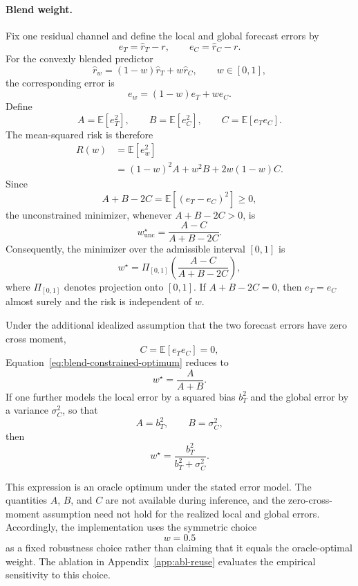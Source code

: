 \paragraph{Blend weight.}
Fix one residual channel and define the local and global forecast errors
by
\[
e_T
=
\widehat r_T-r,
\qquad
e_C
=
\widehat r_C-r.
\]
For the convexly blended predictor
\[
\widehat r_w
=
(1-w)\widehat r_T+w\widehat r_C,
\qquad
w\in[0,1],
\]
the corresponding error is
\[
e_w
=
(1-w)e_T+we_C.
\]
Define
\[
A
=
\mathbb{E}[e_T^2],
\qquad
B
=
\mathbb{E}[e_C^2],
\qquad
C
=
\mathbb{E}[e_Te_C].
\]
The mean-squared risk is therefore
\begin{align}
R(w)
&=
\mathbb{E}[e_w^2]
\nonumber\\
&=
(1-w)^2A+w^2B+2w(1-w)C.
\label{eq:blend-general-risk}
\end{align}
Since
\[
A+B-2C
=
\mathbb{E}\!\left[(e_T-e_C)^2\right]
\geq0,
\]
the unconstrained minimizer, whenever $A+B-2C>0$, is
\begin{equation}
w_{\mathrm{unc}}^\star
=
\frac{A-C}{A+B-2C}.
\label{eq:blend-unconstrained-optimum}
\end{equation}
Consequently, the minimizer over the admissible interval $[0,1]$ is
\begin{equation}
w^\star
=
\Pi_{[0,1]}
\left(
\frac{A-C}{A+B-2C}
\right),
\label{eq:blend-constrained-optimum}
\end{equation}
where $\Pi_{[0,1]}$ denotes projection onto $[0,1]$. If
$A+B-2C=0$, then $e_T=e_C$ almost surely and the risk is independent
of $w$.

Under the additional idealized assumption that the two forecast errors
have zero cross moment,
\begin{equation}
C
=
\mathbb{E}[e_Te_C]
=
0,
\label{eq:blend-uncorrelated-assumption}
\end{equation}
Equation~\eqref{eq:blend-constrained-optimum} reduces to
\begin{equation}
w^\star
=
\frac{A}{A+B}.
\label{eq:blend-uncorrelated-optimum}
\end{equation}
If one further models the local error by a squared bias $b_T^2$ and the
global error by a variance $\sigma_C^2$, so that
\[
A=b_T^2,
\qquad
B=\sigma_C^2,
\]
then
\begin{equation}
w^\star
=
\frac{b_T^2}{b_T^2+\sigma_C^2}.
\label{eq:blend-bias-variance-optimum}
\end{equation}

This expression is an oracle optimum under the stated error model. The
quantities $A$, $B$, and $C$ are not available during inference, and
the zero-cross-moment assumption need not hold for the realized local
and global errors. Accordingly, the implementation uses the symmetric
choice
\[
w=0.5
\]
as a fixed robustness choice rather than claiming that it equals the
oracle-optimal weight. The ablation in
Appendix~\ref{app:abl-reuse} evaluates the empirical sensitivity to
this choice.

